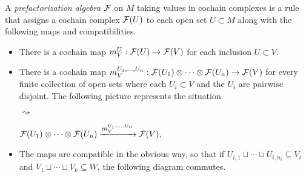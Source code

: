 \documentclass[11pt]{amsart}
\begin{document}
\begin{dfn}
A {\em prefactorization algebra} $\mathcal F$ on $M$ taking values in cochain complexes is a rule that assigns a cochain complex $\mathcal F(U)$ to each open set $U \subset M$ along with the following maps and compatibilities.
\begin{itemize}
\item  There is a cochain map $m_V^U: \mathcal F(U) \rightarrow \mathcal F(V)$ for each inclusion $U \subset V$.

\item There is a cochain map $m_V^{U_1,\ldots,U_n} : \mathcal F(U_1) \otimes \cdots \otimes \mathcal F(U_n) \rightarrow \mathcal F(V)$ for every finite collection of open sets where each $U_i \subset V$ and the $U_i$ are pairwise disjoint. The following picture represents the situation.
\begin{center}
 \begin{minipage}[c]{3cm}
 \end{minipage}
\hspace{0.7cm} $\rightsquigarrow$ \hspace{0.5cm}
 \begin{minipage}[c]{8cm}
$\mathcal F(U_1)\otimes\dots\otimes\mathcal F(U_n)\xrightarrow{m_V^{U_1,\ldots,U_n}}\mathcal F(V),$
 \end{minipage}
\end{center}

\item The maps are compatible in the obvious way, so that if $U_{i,1}\sqcup\cdots\sqcup U_{i,n_i}\subseteq V_i$ and $V_1\sqcup\cdots\sqcup V_k\subseteq W$, the following diagram commutes.
\begin{center}
\end{center}
\end{itemize}
\end{dfn}
\end{document}
